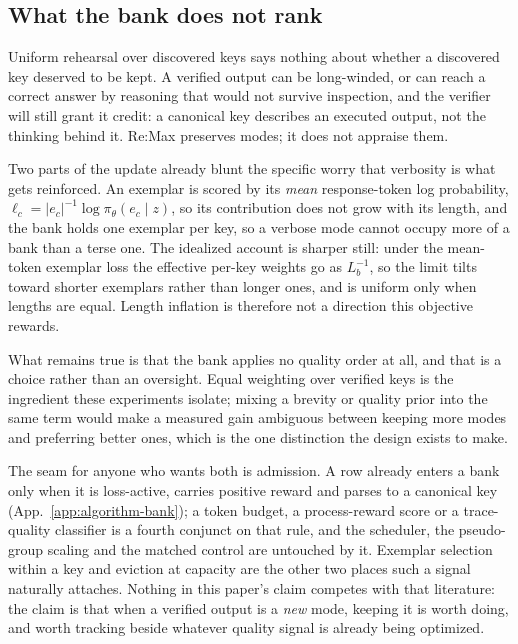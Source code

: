 \documentclass{article}
\newcommand{\1}{\mathbf 1}
\theoremstyle{remark}
\theoremstyle{definition}
\theoremstyle{plain}
\begin{document}
\subsection{What the bank does not rank}
\label{app:algorithm-quality}

Uniform rehearsal over discovered keys says nothing about whether a discovered
key deserved to be kept. A verified output can be long-winded, or can reach a
correct answer by reasoning that would not survive inspection, and the
verifier will still grant it credit: a canonical key describes an executed
output, not the thinking behind it. Re:Max preserves modes; it does not
appraise them.

Two parts of the update already blunt the specific worry that verbosity is
what gets reinforced. An exemplar is scored by its \emph{mean} response-token
log probability, $\ell_c=|e_c|^{-1}\log\pi_\theta(e_c\mid z)$, so its
contribution does not grow with its length, and the bank holds one exemplar
per key, so a verbose mode cannot occupy more of a bank than a terse one. The
idealized account is sharper still: under the mean-token exemplar loss the
effective per-key weights go as $L_b^{-1}$, so the limit tilts toward shorter
exemplars rather than longer ones, and is uniform only when lengths are equal.
Length inflation is therefore not a direction this objective rewards.

What remains true is that the bank applies no quality order at all, and that
is a choice rather than an oversight. Equal weighting over verified keys is
the ingredient these experiments isolate; mixing a brevity or quality prior
into the same term would make a measured gain ambiguous between keeping more
modes and preferring better ones, which is the one distinction the design
exists to make.

The seam for anyone who wants both is admission. A row already enters a bank
only when it is loss-active, carries positive reward and parses to a canonical
key (App.~\ref{app:algorithm-bank}); a token budget, a process-reward score or
a trace-quality classifier is a fourth conjunct on that rule, and the
scheduler, the pseudo-group scaling and the matched control are untouched by
it. Exemplar selection within a key and eviction at capacity are the other two
places such a signal naturally attaches. Nothing in this paper's claim
competes with that literature: the claim is that when a verified output is a
\emph{new} mode, keeping it is worth doing, and worth tracking beside whatever
quality signal is already being optimized.
\end{document}
